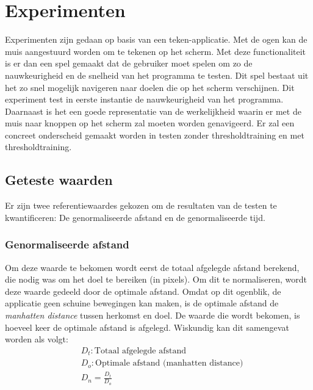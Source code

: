 \documentclass{article}
\begin{document}
\section{Experimenten}
Experimenten zijn gedaan op basis van een teken-applicatie. Met de ogen kan de muis aangestuurd worden om te tekenen op het scherm. Met deze functionaliteit is er dan een spel gemaakt dat de gebruiker moet spelen om zo de nauwkeurigheid en de snelheid van het programma te testen. Dit spel bestaat uit het zo snel mogelijk navigeren naar doelen die op het scherm verschijnen. Dit experiment test in eerste instantie de nauwkeurigheid van het programma. Daarnaast is het een goede representatie van de werkelijkheid waarin er met de muis naar knoppen op het scherm zal moeten worden genavigeerd. Er zal een concreet onderscheid gemaakt worden in testen zonder thresholdtraining en met thresholdtraining.
\subsection{Geteste waarden}
Er zijn twee referentiewaardes gekozen om de resultaten van de testen te kwantificeren: De genormaliseerde afstand en de genormaliseerde tijd.

\subsubsection*{Genormaliseerde afstand}
Om deze waarde te bekomen wordt eerst de totaal afgelegde afstand berekend, die nodig was om het doel te bereiken (in pixels). Om dit te normaliseren, wordt deze waarde gedeeld door de optimale afstand. Omdat op dit ogenblik, de applicatie geen schuine bewegingen kan maken, is de optimale afstand de \textit{manhatten distance} \cite{manhdist} tussen herkomst en doel. De waarde die wordt bekomen, is hoeveel keer de optimale afstand is afgelegd. Wiskundig kan dit samengevat worden als volgt:
\begin{align*}
	&D_t: \text{Totaal afgelegde afstand}\\
	&D_o: \text{Optimale afstand (manhatten distance)}\\
	&D_n = \frac{D_t}{D_o}
\end{align*}
\end{document}

